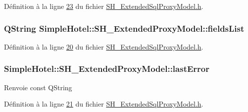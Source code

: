 Définition à la ligne \hyperlink{SH__ExtendedSqlProxyModel_8h_source_l00023}{23} du fichier \hyperlink{SH__ExtendedSqlProxyModel_8h_source}{S\-H\-\_\-\-Extended\-Sql\-Proxy\-Model.\-h}.

\hypertarget{classSimpleHotel_1_1SH__ExtendedProxyModel_a8872cff3d50bf25b1673ed2c951eeb4a}{
\subsubsection[{fields\-List}]{\setlength{\rightskip}{0pt plus 5cm}Q\-String Simple\-Hotel\-::\-S\-H\-\_\-\-Extended\-Proxy\-Model\-::fields\-List\hspace{0.3cm}{\ttfamily [read]}}}\label{classSimpleHotel_1_1SH__ExtendedProxyModel_a8872cff3d50bf25b1673ed2c951eeb4a}


Définition à la ligne \hyperlink{SH__ExtendedSqlProxyModel_8h_source_l00020}{20} du fichier \hyperlink{SH__ExtendedSqlProxyModel_8h_source}{S\-H\-\_\-\-Extended\-Sql\-Proxy\-Model.\-h}.

\hypertarget{classSimpleHotel_1_1SH__ExtendedProxyModel_a8b5c74b23d91bde591eba6d32a20c30f}{
\subsubsection[{last\-Error}]{\setlength{\rightskip}{0pt plus 5cm}Simple\-Hotel\-::\-S\-H\-\_\-\-Extended\-Proxy\-Model\-::last\-Error\hspace{0.3cm}{\ttfamily [read]}}}\label{classSimpleHotel_1_1SH__ExtendedProxyModel_a8b5c74b23d91bde591eba6d32a20c30f}
\begin{DoxyReturn}{Renvoie}
const Q\-String 
\end{DoxyReturn}


Définition à la ligne \hyperlink{SH__ExtendedSqlProxyModel_8h_source_l00021}{21} du fichier \hyperlink{SH__ExtendedSqlProxyModel_8h_source}{S\-H\-\_\-\-Extended\-Sql\-Proxy\-Model.\-h}.

